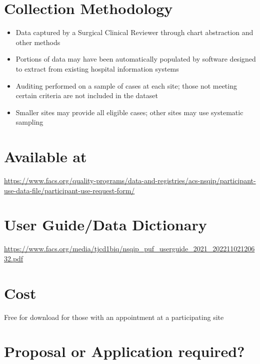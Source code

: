 \documentclass[
]{book}
\providecommand{\tightlist}{%
  \setlength{\itemsep}{0pt}\setlength{\parskip}{0pt}}
\begin{document}
\hypertarget{collection-methodology-2}{%
\section{Collection Methodology}\label{collection-methodology-2}}

\begin{itemize}
\tightlist
\item
  Data captured by a Surgical Clinical Reviewer through chart abstraction and other methods
\item
  Portions of data may have been automatically populated by software designed to extract from existing hospital information systems
\item
  Auditing performed on a sample of cases at each site; those not meeting certain criteria are not included in the dataset
\item
  Smaller sites may provide all eligible cases; other sites may use systematic sampling
\end{itemize}

\hypertarget{available-at-2}{%
\section{Available at}\label{available-at-2}}

\url{https://www.facs.org/quality-programs/data-and-registries/acs-nsqip/participant-use-data-file/participant-use-request-form/}

\hypertarget{user-guidedata-dictionary-2}{%
\section{User Guide/Data Dictionary}\label{user-guidedata-dictionary-2}}

\url{https://www.facs.org/media/tjcd1biq/nsqip_puf_userguide_2021_20221102120632.pdf}

\hypertarget{cost-2}{%
\section{Cost}\label{cost-2}}

Free for download for those with an appointment at a participating site

\hypertarget{proposal-or-application-required-2}{%
\section{Proposal or Application required?}\label{proposal-or-application-required-2}}
\end{document}
